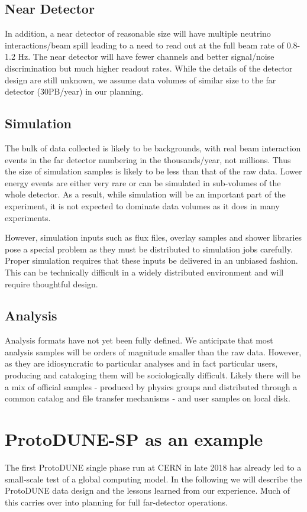 \subsection{Near Detector}
In addition, a near detector of reasonable size will have multiple neutrino interactions/beam spill leading to a need to read out at the full beam rate of 0.8-1.2 Hz.
The near detector will have fewer channels and better signal/noise discrimination but much higher readout rates.  While the details of the detector design are still unknown, we assume data volumes of similar size to the far detector (30PB/year) in our planning.

\subsection{Simulation}
The bulk of data collected is likely to be backgrounds, with real beam interaction events in the far detector numbering in the thousands/year, not millions. Thus the size of simulation samples is likely to be less than that of the raw data.  Lower energy events are either very rare or can be simulated in sub-volumes of the whole detector.  As a result, while simulation will be an important part of the experiment, it is not expected to dominate data volumes as it does in many experiments.

However, simulation inputs such as flux files, overlay samples and shower libraries pose a special problem as they must be distributed to simulation jobs carefully.  Proper simulation requires that these inputs be delivered in an unbiased fashion. This can be technically difficult in a widely distributed environment and will require thoughtful design.

\subsection{Analysis}

Analysis formats have not yet been fully defined.  We anticipate that most analysis samples will be orders of magnitude smaller than the raw data.  However, as they are idiosyncratic to particular analyses and in fact particular users,  producing and cataloging them will be sociologically difficult.
Likely there will be a mix of official samples -  produced by physics groups and distributed through a common catalog and file transfer mechanisms - and user samples on local disk.


\section{ProtoDUNE-SP as an example}
\label{ch:exec-comp-proto-SP}
The first ProtoDUNE single phase run at CERN in late 2018 has already led to a small-scale test of a global computing model.  In the following we will describe the ProtoDUNE data design and the lessons learned from our experience. Much of this carries over into planning for full far-detector operations.

